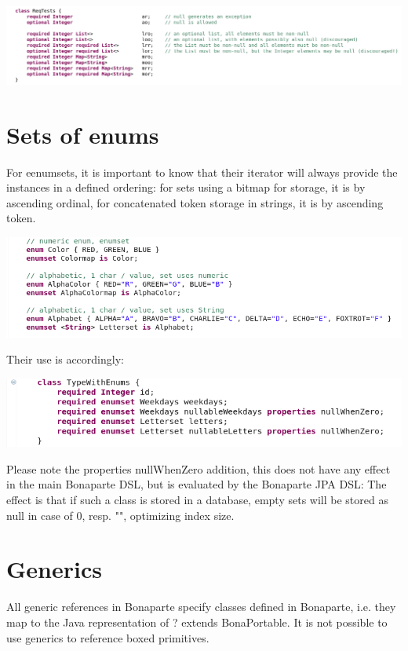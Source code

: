 \documentclass[11pt,a4paper,oneside]{article}
\begin{document}
\hspace{1cm}\includegraphics[scale=0.5]{images/tut1-016-collections.png}


\section{Sets of enums}
For eenumsets, it is important to know that their iterator will always provide the instances in a defined ordering: for
sets using a bitmap for storage, it is by ascending ordinal, for concatenated token storage in strings, it is by ascending
token.

\vspace{2mm}

\hspace{1cm}\includegraphics[scale=0.5]{images/tut1-enumsets1.png}

Their use is accordingly:

\vspace{2mm}

\hspace{1cm}\includegraphics[scale=0.5]{images/tut1-enumsets2.png}

Please note the {\ttfamily properties nullWhenZero} addition, this does not have any effect in the main Bonaparte DSL, but is
evaluated by the Bonaparte JPA DSL: The effect is that if such a class is stored in a database, empty sets will be stored as
{\ttfamily null} in case of 0, resp. {\ttfamily ""}, optimizing index size.


\section{Generics}
All generic references in Bonaparte specify classes defined in Bonaparte, i.e. they map to the Java representation of {\ttfamily
? extends BonaPortable}. It is not possible to use generics to reference boxed primitives.
\end{document}
